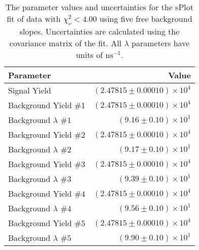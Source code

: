 
\begin{table}[ht]
    \begin{center}
        \begin{tabular}{lr}\toprule
            Parameter & Value \\\midrule
            Signal Yield & $(2.47815 \pm 0.00010) \times 10^{4}$ \\
            Background Yield $\#1$ & $(2.47815 \pm 0.00010) \times 10^{4}$ \\
            Background $\lambda$ $\#1$ & $(9.16 \pm 0.10) \times 10^{1}$ \\
            Background Yield $\#2$ & $(2.47815 \pm 0.00010) \times 10^{4}$ \\
            Background $\lambda$ $\#2$ & $(9.17 \pm 0.10) \times 10^{1}$ \\
            Background Yield $\#3$ & $(2.47815 \pm 0.00010) \times 10^{4}$ \\
            Background $\lambda$ $\#3$ & $(9.39 \pm 0.10) \times 10^{1}$ \\
            Background Yield $\#4$ & $(2.47815 \pm 0.00010) \times 10^{4}$ \\
            Background $\lambda$ $\#4$ & $(9.56 \pm 0.10) \times 10^{1}$ \\
            Background Yield $\#5$ & $(2.47815 \pm 0.00010) \times 10^{4}$ \\
            Background $\lambda$ $\#5$ & $(9.90 \pm 0.10) \times 10^{1}$ \\\bottomrule
        \end{tabular}
        \caption{The parameter values and uncertainties for the sPlot fit of data with $\chi^2_\nu < 4.00$ using five free background slopes. Uncertainties are calculated using the covariance matrix of the fit. All $\lambda$ parameters have units of $\si{\nano\second}^{-1}$.}\label{tab:splot-fit-results-chisqdof-4.00-free-5}
    \end{center}
\end{table}
